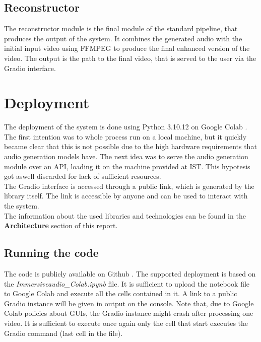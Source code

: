 \documentclass[conference]{IEEEtran}
\begin{document}
\subsection{Reconstructor}
The reconstructor module is the final module of the standard pipeline, that produces the output of the system.
It combines the generated audio with the initial input video using FFMPEG \cite{ffmpeg} to produce the final enhanced version of the video. 
The output is the path to the final video, that is served to the user via the Gradio interface.

\section{Deployment}
The deployment of the system is done using Python 3.10.12 on Google Colab \cite{Colab}. The first intention was to whole process run on a local machine, but it quickly became clear that this is not possible due to the high hardware requirements that audio generation models have.
The next idea was to serve the audio generation module over an API, loading it on the machine provided at IST. This hypotesis got aswell discarded for lack of sufficient resources.
\\The Gradio interface is accessed through a public link, which is generated by the library itself. The link is accessible by anyone and can be used to interact with the system.
\\The information about the used libraries and technologies can be found in the \textbf{Architecture} section of this report.

\subsection{Running the code}
The code is publicly available on Github \cite{immersiveaudio}. The supported deployment is based on the \emph{Immersiveaudio\_Colab.ipynb} file. It is sufficient to upload the notebook file to Google Colab and execute all the cells contained in it. A link to a public Gradio instance will be given in output on the console. Note that, due to Google Colab policies about GUIs, the Gradio instance might crash after processing one video. It is sufficient to execute once again only the cell that start executes the Gradio command (last cell in the file).
\end{document}
